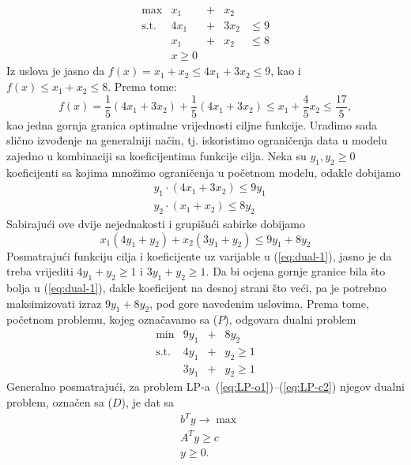\documentclass[a4paper, utf8, 11pt, colorlinks]{book}
\begin{document}
$$ 
\begin{array}{lllll}
    \max                  &x_1 &+& x_2   &               \\
    \mbox{s.t.}  &4x_1 & +&3 x_2 & \leq 9        \\
                          &x_1 &+ &x_2   &  \leq 8       \\
                          &x \geq 0  &  &     &      
 \end{array}
$$
Iz uslova je jasno da $f(x) = x_1 + x_2 \leq 4 x_1 + 3 x_2 \leq 9$, kao i 
$f(x) \leq x_1 + x_2 \leq 8$. Prema tome:
$$f(x) = \frac{1}{5}(  4 x_1 + 3 x_2  ) + \frac{1}{5}(  4 x_1 + 3 x_2 ) \leq x_1 + \frac{4}{5}x_2 \leq \frac{17}{5},$$ kao jedna gornja granica optimalne vrijednosti ciljne funkcije. 
Uradimo sada slično izvođenje na generalniji način, tj. iskoristimo ograničenja data u modelu zajedno u kombinaciji sa koeficijentima funkcije cilja. Neka su $y_1, y_2 \geq 0$ koeficijenti sa kojima množimo ograničenja u početnom modelu, odakle dobijamo 
\begin{align*}
    &y_1 \cdot (4x_1 + 3x_2) \leq 9 y_1 \\
    &y_2 \cdot (x_1 + x_2 ) \leq 8 y_2 
\end{align*}
Sabirajući ove dvije nejednakosti i grupišući sabirke dobijamo 
\begin{equation}\label{eq:dual-1}
     x_1 ( 4 y_1 + y_2 ) + x_2 ( 3 y_1 + y_2 ) \leq 9 y_1 + 8 y_2 
\end{equation}
Posmatrajući funkciju cilja i koeficijente uz varijable u (\ref{eq:dual-1}), jasno je da treba vrijediti 
$4 y_1 + y_2 \geq 1$ i $3 y_1 + y_2 \geq 1$. Da bi ocjena gornje granice bila što bolja u (\ref{eq:dual-1}), dakle koeficijent na desnoj strani što veći, pa je potrebno maksimizovati izraz $9y_1 + 8 y_2$, pod gore navedenim uslovima. Prema tome, početnom problemu, kojeg označavamo sa ($P$), odgovara dualni problem 
$$\begin{array}{cccc}
     \min                    &  9 y_1 &+& 8 y_2        \\
     \mbox{s.t. }     &  4 y_1 &+& y_2 \geq 1   \\
                             &  3 y_1 &+& y_2 \geq 1
\end{array}$$
Generalno posmatrajući, za problem LP-a~(\ref{eq:LP-o1})--(\ref{eq:LP-c2}) njegov dualni problem, označen sa ($D$), je dat sa 
\begin{align}
     & b^T y \rightarrow \max \\
     & A^T y \geq c \\
     & y \geq 0.
\end{align}
\end{document}
